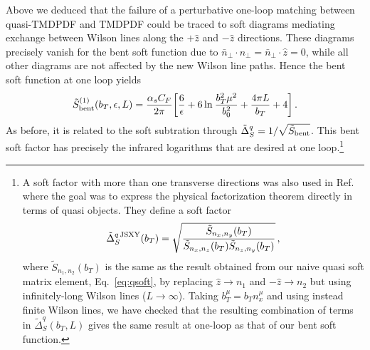 \documentclass[11pt,a4paper]{article}
\DeclareRobustCommand{\eq}[1]{Eq.~\eqref{eq:#1}}
\DeclareRobustCommand{\mycite}[1]{Ref.~\cite{#1}}
\newcommand{\eps}{\epsilon}
\newcommand{\bn}{{\bar{n}}}
\newcommand{\as}{\alpha_s}
\newcommand{\Lb}[1]{\ln^{#1}\frac{b_T^2 \mu^2}{b_0^2}}
\begin{document}
Above we deduced that the failure of a perturbative one-loop matching between quasi-TMDPDF and TMDPDF could be traced to soft diagrams mediating exchange between Wilson lines along the $+\hat z$ and $-\hat z$ directions.
These diagrams precisely vanish for the bent soft function due to $\bn_\perp \cdot n_\perp = \bn_\perp \cdot \hat z = 0$,
while all other diagrams are not affected by the new Wilson line paths.
Hence the bent soft function at one loop yields
\begin{align} \label{eq:S_bent_nlo}
 \tilde S_{\rm bent}^{(1)}(b_T,\eps,L) =
 \frac{\as C_F}{2\pi} \biggl[ \frac{6}{\eps} + 6\Lb{} + \frac{4\pi L}{b_T}  + 4\biggr]
\,.\end{align}
As before, it is related to the soft subtration through $\tilde\Delta_S^q = 1/\sqrt{\tilde S_{\rm bent}}$. This bent soft factor has precisely the infrared logarithms that are desired at one loop.\footnote{
A soft factor with more than one transverse directions was also used in \mycite{Ji:2014hxa} where the goal was to express the physical factorization theorem directly in terms of quasi objects. They define a soft factor
\begin{align} \label{eq:qsoft_JSXY}
 \tilde \Delta_S^{q\,{\rm JSXY}}(b_T)
 = \sqrt{ \frac{\tilde S_{n_x,n_y}(b_T)}{\tilde S_{n_x,n_z}(b_T) \tilde S_{n_z,n_y}(b_T)} }
\,,\end{align}
where $\tilde S_{n_1,n_2}(b_T)$ is the same as the result obtained from our naive quasi soft matrix element, \eq{qsoft}, by replacing $\hat z \to n_1$ and $-\hat z \to n_2$ 
but using infinitely-long Wilson lines ($L\to \infty$). 
Taking $b_T^\mu=b_Tn_x^\mu$ and using instead finite Wilson lines, we have checked that the resulting combination of terms in $\tilde \Delta_S^{q}(b_T, L)$ gives the same result at one-loop as that of our bent soft function.
}
\end{document}
